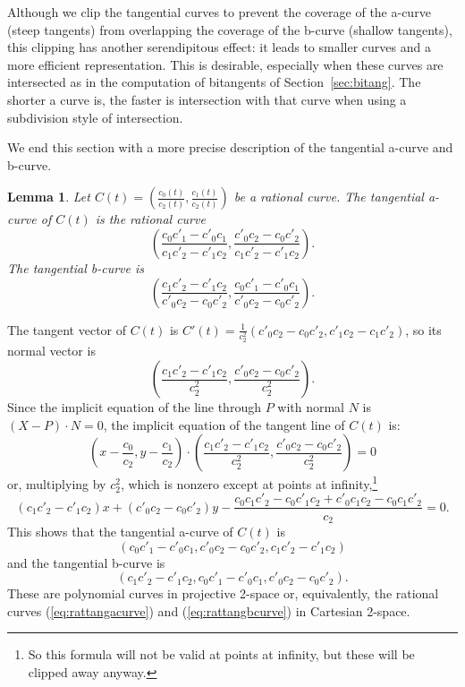 \documentclass[12pt]{article}
\newcommand{\QED}{\vrule height 1.4ex width 1.0ex depth -.1ex\ \vspace{.3in}} %
\newcommand{\prf}{\noindent{{\bf Proof}:\ \ \ }}
\newtheorem{lemma}[theorem]{Lemma}
\begin{document}
Although we clip the tangential curves to prevent the coverage of the a-curve
(steep tangents) from overlapping the coverage of the b-curve (shallow tangents),
this clipping has another serendipitous effect: it leads to smaller curves
and a more efficient representation.
This is desirable, especially when these curves are intersected
as in the computation of bitangents of Section~\ref{sec:bitang}.
The shorter a curve is, the faster is intersection with that curve
when using a subdivision style of intersection.


We end this section with a more precise description of the tangential a-curve
and b-curve.

\begin{lemma}
\label{lem:rattangacurve}
Let $C(t) = (\frac{c_0(t)}{c_2(t)}, \frac{c_1(t)}{c_2(t)})$ be a rational curve.
The tangential a-curve of $C(t)$ is the rational curve
\begin{equation}
\label{eq:rattangacurve}
	(\frac{c_0 c'_1 - c'_0 c_1}{c_1 c'_2 - c'_1 c_2},
	 \frac{c'_0 c_2 - c_0 c'_2}{c_1 c'_2 - c'_1 c_2}).
\end{equation}
The tangential b-curve is
\begin{equation}
\label{eq:rattangbcurve}
	(\frac{c_1 c'_2 - c'_1 c_2}{c'_0 c_2 - c_0 c'_2},
	 \frac{c_0 c'_1 - c'_0 c_1}{c'_0 c_2 - c_0 c'_2}).
\end{equation}

\end{lemma}
\prf
The tangent vector of $C(t)$ is 
$C'(t) = \frac{1}{c_2^2} (c'_0 c_2 - c_0 c'_2, c'_1 c_2 - c_1 c'_2)$,
so its normal vector is 
\[
	(\frac{c_1 c'_2 - c'_1 c_2}{c_2^2}, 
	 \frac{c'_0 c_2 - c_0 c'_2}{c_2^2}).
\]
Since the implicit equation of the line through $P$ with normal $N$ is 
$(X-P) \cdot N = 0$,
the implicit equation of the tangent line of $C(t)$ is:
\[
	(x - \frac{c_0}{c_2}, y - \frac{c_1}{c_2}) \cdot
	(\frac{c_1 c'_2 - c'_1 c_2}{c_2^2},
	 \frac{c'_0 c_2 - c_0 c'_2}{c_2^2}) = 0
\]
or, multiplying by $c_2^2$, which is nonzero except at points at infinity,\footnote{So
	this formula will not be valid at points at infinity,
	but these will be clipped away anyway.}
\[
	(c_1 c'_2 - c'_1 c_2) x +
	(c'_0 c_2 - c_0 c'_2) y -
	\frac{c_0c_1c'_2 - c_0c'_1c_2 + c'_0c_1c_2 - c_0c_1c'_2}{c_2} = 0.
\]
This shows that the tangential a-curve of $C(t)$ is 
\[
	(c_0c'_1 - c'_0c_1, c'_0 c_2 - c_0 c'_2, c_1 c'_2 - c'_1 c_2)
\]
and the tangential b-curve is 
\[
	(c_1 c'_2 - c'_1 c_2, c_0c'_1 - c'_0c_1, c'_0 c_2 - c_0 c'_2).
\]
These are polynomial curves in projective 2-space or, equivalently, the rational
curves (\ref{eq:rattangacurve}) and (\ref{eq:rattangbcurve}) in Cartesian 2-space.
\QED
\end{document}
